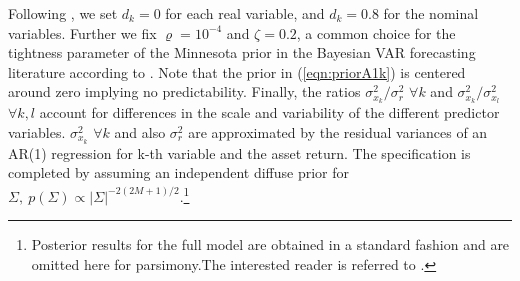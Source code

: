 Following \cite{frey2015}, we set $d_k=0$ for each real variable, and $d_k=0.8$ for the nominal variables. Further we fix $\varrho=10^{-4}$ and $\zeta=0.2$, a common choice for the tightness parameter of the Minnesota prior in the Bayesian VAR forecasting literature according to \cite{carriero2015}. Note that the prior in (\ref{eqn:priorA1k}) is centered around zero implying no predictability. Finally, the ratios $\sigma_{x_k}^2\big/\sigma_{r}^2$ $\forall k$ and $\sigma_{x_k}^2\big/\sigma_{x_l}^2$ $\forall k,l$ account for differences in the scale and variability of the different predictor variables. $\sigma_{x_k}^2$ $\forall k$ and also $\sigma_{r}^2$ are approximated by the residual variances of an AR(1) regression for k-th variable and the asset return. The specification is completed by assuming an independent diffuse prior for $\Sigma, \ p(\Sigma) \propto | \Sigma|^{-2(2M+1)/2}$.\footnote{Posterior results for the full model are obtained in a standard fashion and are omitted here for parsimony.The interested reader is referred to \cite{koop2010}.}

